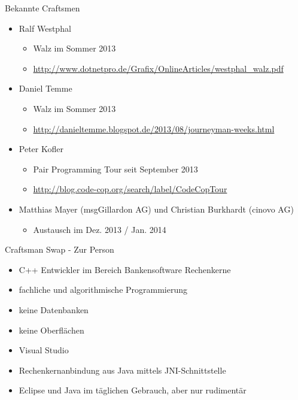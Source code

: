 \begin{frame}{Bekannte Craftsmen}

\begin{itemize}
\item Ralf Westphal
\begin{itemize}
\item Walz im Sommer 2013
\item \url{http://www.dotnetpro.de/Grafix/OnlineArticles/westphal_walz.pdf}
\end{itemize}


\item Daniel Temme
\begin{itemize}
\item Walz im Sommer 2013
\item \url{http://danieltemme.blogspot.de/2013/08/journeyman-weeks.html}
\end{itemize}

\item Peter Kofler
\begin{itemize}
\item \glqq{}Pair Programming Tour\grqq{} seit September 2013
\item \url{http://blog.code-cop.org/search/label/CodeCopTour}
\end{itemize}

\item Matthias Mayer (msgGillardon AG) und Christian Burkhardt (cinovo AG)
\begin{itemize}
\item Austausch im Dez. 2013 / Jan. 2014
\end{itemize}


\end{itemize}

\end{frame}


\begin{frame}{Craftsman Swap - Zur Person}


\begin{itemize}
\item C++ Entwickler im Bereich Bankensoftware Rechenkerne
\item fachliche und algorithmische Programmierung
\item keine Datenbanken
\item keine Oberflächen
\item Visual Studio 
\item Rechenkernanbindung aus Java mittels JNI-Schnittstelle
\item Eclipse und Java im täglichen Gebrauch, aber nur rudimentär

\end{itemize}


\end{frame}

